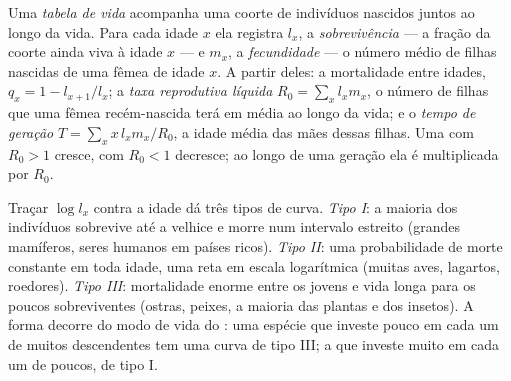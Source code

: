 \begin{definition}\label{def:b1:populations:lifetable}
Uma \emph{tabela de vida} acompanha uma coorte de indivíduos nascidos
juntos ao longo da vida. Para cada idade $x$ ela registra $l_x$, a
\emph{sobrevivência} --- a fração da coorte ainda viva à idade $x$ ---
e $m_x$, a \emph{fecundidade} --- o número médio de filhas nascidas de
uma fêmea de idade $x$. A partir deles: a mortalidade entre idades,
$q_x = 1 - l_{x+1}/l_x$; a \emph{taxa reprodutiva líquida}
$R_0 = \sum_x l_x m_x$, o número de filhas que uma fêmea recém-nascida
terá em média ao longo da vida; e o \emph{tempo de geração}
$T = \sum_x x\,l_x m_x / R_0$, a idade média das mães dessas filhas.
Uma  com $R_0 > 1$ cresce, com $R_0 < 1$ decresce; ao longo
de uma geração ela é multiplicada por $R_0$.
\end{definition}

\begin{proposition}\label{prop:b1:populations:survivorship}
Traçar $\log l_x$ contra a idade dá três tipos de curva. \emph{Tipo
I}: a maioria dos indivíduos sobrevive até a velhice e morre num
intervalo estreito (grandes mamíferos, seres humanos em países ricos).
\emph{Tipo II}: uma probabilidade de morte constante em toda idade,
uma reta em escala logarítmica (muitas aves, lagartos, roedores).
\emph{Tipo III}: mortalidade enorme entre os jovens e vida longa para
os poucos sobreviventes (ostras, peixes, a maioria das plantas e dos
insetos). A forma decorre do modo de vida do : uma espécie
que investe pouco em cada um de muitos descendentes tem uma curva de
tipo III; a que investe muito em cada um de poucos, de tipo I.
\end{proposition}

